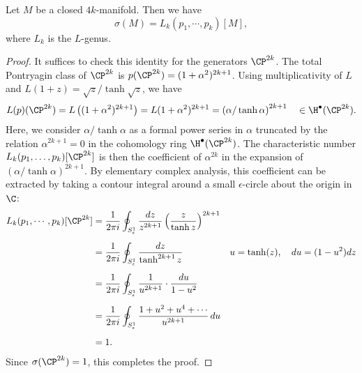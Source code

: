 \begin{theorem}[Hirzebruch]\label{thm:hirzebruch-signature-theorem}
	Let $M$ be a closed $4k$-manifold. Then we have
	\[
		\sigma(M) = L_k(p_1, \cdots, p_k)[M],
	\]
	where $L_k$ is the $L$-genus.
\end{theorem}
\begin{proof}
	It suffices to check this identity for the generators $\CP^{2k}$. The total Pontryagin class of $\CP^{2k}$ is $p(\CP^{2k})=(1+\alpha^2)^{2k+1}$. Using multiplicativity of $L$ and $L(1+z)=\sqrt{z}/\tanh\sqrt{z}$, we have
	\[
		\begin{aligned}
			L(p)(\CP^{2k})
			= L\left((1+\alpha^2)^{2k+1}\right)
			= L(1+\alpha^2)^{2k+1}
			= \left(\alpha/\tanh \alpha\right)^{2k+1}
			\quad\in\H^\bullet(\CP^{2k}).
		\end{aligned}
	\]
	Here, we consider $\alpha/\tanh \alpha$ as a formal power series in $\alpha$ truncated by the relation $\alpha^{2k+1}=0$ in the cohomology ring $\H^\bullet(\CP^{2k})$. The characteristic number $L_k(p_1,\ldots,p_k)[\CP^{2k}]$ is then the coefficient of $\alpha^{2k}$ in the expansion of $(\alpha/\tanh \alpha)^{2k+1}$.
	By elementary complex analysis, this coefficient can be extracted by taking a contour integral around a small $\epsilon$-circle about the origin in $\C$:
	\[
		\begin{aligned}
			L_k(p_1,\cdots, p_k)[\CP^{2k}]
			 & = \frac{1}{2\pi i}\oint_{S^1_\epsilon} \frac{dz}{z^{2k+1}} \left(\frac{z}{\tanh z}\right)^{2k+1}
			 &                                                                                                    \\[0.5em]
			 & = \frac{1}{2\pi i}\oint_{S^1_\epsilon} \frac{dz}{\tanh^{2k+1} z}\quad
			 & u  =\tanh(z),\quad
			du =(1-u^2)dz
			\\[0.5em]
			 & = \frac{1}{2\pi i}\oint_{S^1_\epsilon} \frac{1}{u^{2k+1}}\cdot\frac{du}{1-u^2}
			 &                                                                                                    \\[0.5em]
			 & = \frac{1}{2\pi i}\oint_{S^1_\epsilon} \frac{1+u^2+u^4+\cdots}{u^{2k+1}}\,du                       \\[0.5em]
			 & =1.                                                                                              &
		\end{aligned}
	\]
	Since $\sigma(\CP^{2k})=1$, this completes the proof.
\end{proof}

